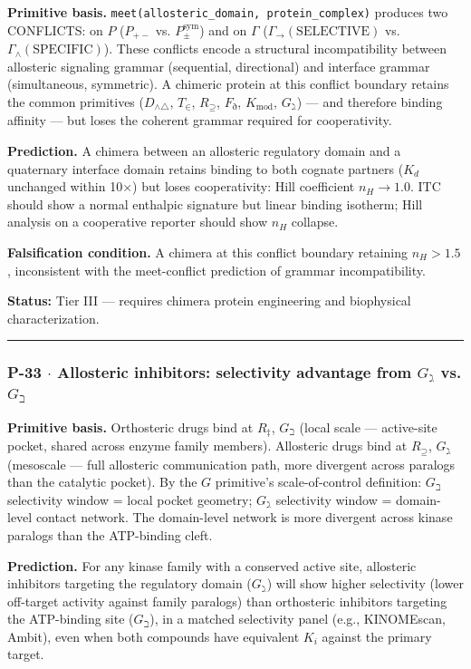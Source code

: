 \documentclass[12pt,a4paper]{article}
\begin{document}
\textbf{Primitive basis.} \texttt{meet(allosteric\_domain, protein\_complex)} produces two CONFLICTS: on $P$ ($P_{+-}$ vs. $P_\pm^\text{sym}$) and on $\Gamma$ ($\Gamma_\to(\text{SELECTIVE})$ vs. $\Gamma_\wedge(\text{SPECIFIC})$). These conflicts encode a structural incompatibility between allosteric signaling grammar (sequential, directional) and interface grammar (simultaneous, symmetric). A chimeric protein at this conflict boundary retains the common primitives ($D_{\wedge\triangle}$, $T_\in$, $R_\supseteq$, $F_\eth$, $K_\text{mod}$, $G_\gimel$) --- and therefore binding affinity --- but loses the coherent grammar required for cooperativity.

\textbf{Prediction.} A chimera between an allosteric regulatory domain and a quaternary interface domain retains binding to both cognate partners ($K_d$ unchanged within 10$\times$) but loses cooperativity: Hill coefficient $n_H \to 1.0$. ITC should show a normal enthalpic signature but linear binding isotherm; Hill analysis on a cooperative reporter should show $n_H$ collapse.

\textbf{Falsification condition.} A chimera at this conflict boundary retaining $n_H > 1.5$, inconsistent with the meet-conflict prediction of grammar incompatibility.

\textbf{Status:} Tier III --- requires chimera protein engineering and biophysical characterization.

\begin{center}
\rule{0.5\textwidth}{0.4pt}
\end{center}

\subsubsection{P-33 $\cdot$ Allosteric inhibitors: selectivity advantage from $G_\gimel$ vs. $G_\beth$}

\textbf{Primitive basis.} Orthosteric drugs bind at $R_\ddagger$, $G_\beth$ (local scale --- active-site pocket, shared across enzyme family members). Allosteric drugs bind at $R_\supseteq$, $G_\gimel$ (mesoscale --- full allosteric communication path, more divergent across paralogs than the catalytic pocket). By the $G$ primitive's scale-of-control definition: $G_\beth$ selectivity window = local pocket geometry; $G_\gimel$ selectivity window = domain-level contact network. The domain-level network is more divergent across kinase paralogs than the ATP-binding cleft.

\textbf{Prediction.} For any kinase family with a conserved active site, allosteric inhibitors targeting the regulatory domain ($G_\gimel$) will show higher selectivity (lower off-target activity against family paralogs) than orthosteric inhibitors targeting the ATP-binding site ($G_\beth$), in a matched selectivity panel (e.g., KINOMEscan, Ambit), even when both compounds have equivalent $K_i$ against the primary target.
\end{document}
